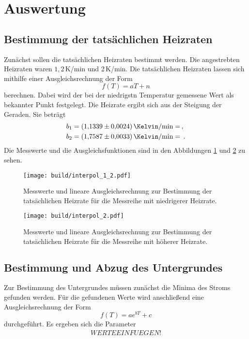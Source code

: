 \section{Auswertung}
\label{sec:Auswertung}

\subsection{Bestimmung der tatsächlichen Heizraten}
Zunächst sollen die tatsächlichen Heizraten bestimmt werden. Die angestrebten
Heizraten waren $1{,}2\,$K/min und 2\,K/min. Die tatsächlichen Heizraten lassen
sich mithilfe einer Ausgleichsrechnung der Form
\begin{equation*}
  f(T)=aT+n
\end{equation*}
berechnen. Dabei wird der bei der niedrigstn Temperatur gemessene Wert als bekannter
Punkt festgelegt. Die Heizrate ergibt sich aus der Steigung der Geraden. Sie beträgt
\begin{align*}
  b_1&=\SI{1.1339(0024)}{\Kelvin \per \minute}= \,, \\
  b_2&=\SI{1.7587(0033)}{\Kelvin \per \minute}= \,.
\end{align*}
Die Messwerte und die Ausgleichsfunktionen sind in den Abbildungen \ref{fig:heiz1}
und \ref{fig:heiz2} zu sehen.

\begin{figure}
  \centering
  \texttt{[image: build/interpol\_1\_2.pdf]}
  \caption{Messwerte und lineare Ausgleichsrechnung zur Bestimmung der tatsächlichen
  Heizrate für die Messreihe mit niedrigerer Heizrate.}
  \label{fig:heiz1}
\end{figure}
\begin{figure}
  \centering
  \texttt{[image: build/interpol\_2.pdf]}
  \caption{Messwerte und lineare Ausgleichsrechnung zur Bestimmung der tatsächlichen
  Heizrate für die Messreihe mit höherer Heizrate.}
  \label{fig:heiz2}
\end{figure}


\subsection{Bestimmung und Abzug des Untergrundes}

Zur Bestimmung des Untergrundes müssen zunächst die Minima des Stroms gefunden
werden. Für die gefundenen Werte wird anschließend eine Ausgleichsrechnung der
Form
\begin{equation*}
  f(T)=a e^{bT} +c
\end{equation*}
durchgeführt. Es ergeben sich die Parameter
\begin{align*}
  WERTE EINFUEGEN!
\end{align*}

